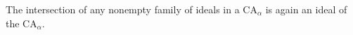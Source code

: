 The intersection of any nonempty family of ideals in a $\mathrm{CA}_{\alpha}$ is again an ideal of the $\mathrm{CA}_{\alpha}$.
